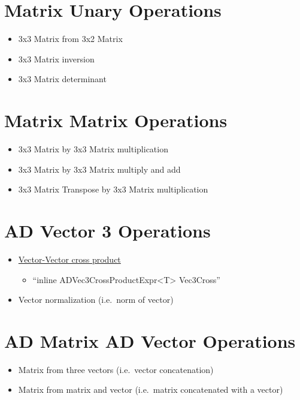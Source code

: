\documentclass[11pt]{article}
\begin{document}
\section{Matrix Unary Operations}\label{sec:matrix-unary-operations}
    \begin{itemize}
        \item 3x3 Matrix from 3x2 Matrix
        \item 3x3 Matrix inversion
        \item 3x3 Matrix determinant
    \end{itemize}

\section{Matrix Matrix Operations}\label{sec:matrix-matrix-operations}
    \begin{itemize}
        \item 3x3 Matrix by 3x3 Matrix multiplication
        \item 3x3 Matrix by 3x3 Matrix multiply and add
        \item 3x3 Matrix Transpose by 3x3 Matrix multiplication
    \end{itemize}


\section{AD Vector 3 Operations}\label{sec:ad-vector-3-operations}
    \begin{itemize}
        \item \href{../include/a2dvecops3d.h}{Vector-Vector cross product}
        \begin{itemize}
            \item ``inline ADVec3CrossProductExpr<T> Vec3Cross''
        \end{itemize}
        \item Vector normalization (i.e.\ norm of vector)
    \end{itemize}

\section{AD Matrix AD Vector Operations}\label{sec:ad-matrix-ad-vector-operations}
    \begin{itemize}
        \item Matrix from three vectors (i.e.\ vector concatenation)
        \item Matrix from matrix and vector (i.e.\ matrix concatenated with a vector)
    \end{itemize}
\end{document}
